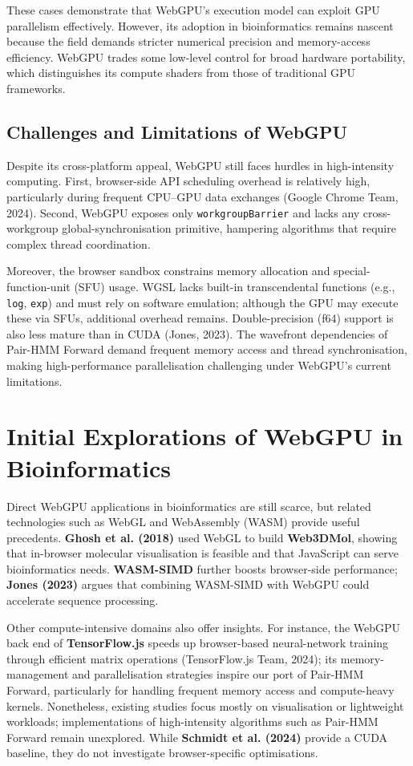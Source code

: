 \documentclass[PhD]{PHlab-thesis}
\begin{document}
These cases demonstrate that WebGPU’s execution model can exploit GPU parallelism effectively. However, its adoption in bioinformatics remains nascent because the field demands stricter numerical precision and memory-access efficiency. WebGPU trades some low-level control for broad hardware portability, which distinguishes its compute shaders from those of traditional GPU frameworks.

\subsection{Challenges and Limitations of WebGPU}
Despite its cross-platform appeal, WebGPU still faces hurdles in high-intensity computing. First, browser-side API scheduling overhead is relatively high, particularly during frequent CPU–GPU data exchanges (Google Chrome Team, 2024). Second, WebGPU exposes only \texttt{workgroupBarrier} and lacks any cross-workgroup global-synchronisation primitive, hampering algorithms that require complex thread coordination.

Moreover, the browser sandbox constrains memory allocation and special-function-unit (SFU) usage. WGSL lacks built-in transcendental functions (e.g., \texttt{log}, \texttt{exp}) and must rely on software emulation; although the GPU may execute these via SFUs, additional overhead remains. Double-precision (f64) support is also less mature than in CUDA (Jones, 2023). The wavefront dependencies of Pair-HMM Forward demand frequent memory access and thread synchronisation, making high-performance parallelisation challenging under WebGPU’s current limitations.

\section{Initial Explorations of WebGPU in Bioinformatics}
Direct WebGPU applications in bioinformatics are still scarce, but related technologies such as WebGL and WebAssembly (WASM) provide useful precedents. \textbf{Ghosh et al. (2018)} used WebGL to build \textbf{Web3DMol}, showing that in-browser molecular visualisation is feasible and that JavaScript can serve bioinformatics needs. \textbf{WASM-SIMD} further boosts browser-side performance; \textbf{Jones (2023)} argues that combining WASM-SIMD with WebGPU could accelerate sequence processing.

Other compute-intensive domains also offer insights. For instance, the WebGPU back end of \textbf{TensorFlow.js} speeds up browser-based neural-network training through efficient matrix operations (TensorFlow.js Team, 2024); its memory-management and parallelisation strategies inspire our port of Pair-HMM Forward, particularly for handling frequent memory access and compute-heavy kernels. Nonetheless, existing studies focus mostly on visualisation or lightweight workloads; implementations of high-intensity algorithms such as Pair-HMM Forward remain unexplored. While \textbf{Schmidt et al. (2024)} provide a CUDA baseline, they do not investigate browser-specific optimisations.
\end{document}
